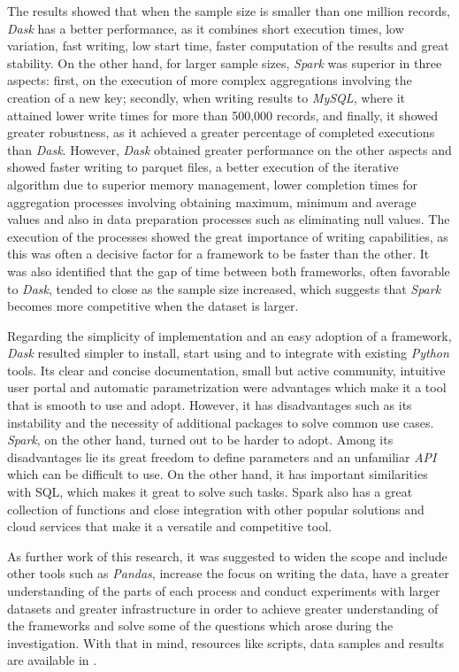 \documentclass[11pt, oneside]{book}
\begin{document}
The results showed that when the sample size is smaller than one million records, \textit{Dask} has a better performance, as it combines short execution times, low variation, fast writing, low start time, faster computation of the results and great stability. On the other hand, for larger sample sizes, \textit{Spark} was superior in three aspects: first, on the execution of more complex aggregations involving the creation of a new key; secondly, when writing results to \textit{MySQL}, where it attained lower write times for more than 500,000 records, and finally, it showed greater robustness, as it achieved a greater percentage of completed executions than \textit{Dask}. However, \textit{Dask} obtained greater performance on the other aspects and showed faster writing to parquet files, a better execution of the iterative algorithm due to superior memory management, lower completion times for aggregation processes involving obtaining maximum, minimum and average values and also in data preparation processes such as eliminating null values. The execution of the processes showed the great importance of writing capabilities, as this was often a decisive factor for a framework to be faster than the other. It was also identified that the gap of time between both frameworks, often favorable to \textit{Dask}, tended to close as the sample size increased, which suggests that \textit{Spark} becomes more competitive when the dataset is larger. 

Regarding the simplicity of implementation and an easy adoption of a framework, \textit{Dask} resulted simpler to install, start using and to integrate with existing \textit{Python} tools. Its clear and concise documentation, small but active community, intuitive user portal and automatic parametrization were advantages which make it a tool that is smooth to use and adopt. However, it has disadvantages such as its instability and the necessity of additional packages to solve common use cases. \textit{Spark}, on the other hand, turned out to be harder to adopt. Among its disadvantages lie its great freedom to define parameters and an unfamiliar \textit{API} which can be difficult to use. On the other hand, it has important similarities with SQL, which makes it great to solve such tasks. Spark also has a great collection of functions and close integration with other popular solutions and cloud services that make it a versatile and competitive tool.

As further work of this research, it was suggested to widen the scope and include other tools such as \textit{Pandas}, increase the focus on writing the data, have a greater understanding of the parts of each process and conduct experiments with larger datasets and greater infrastructure in order to achieve greater understanding of the frameworks and solve some of the questions which arose during the investigation. With that in mind, resources like scripts, data samples and results are available in \cite{repo-spark-rita}.
\end{document}
